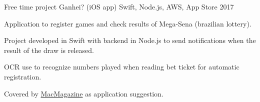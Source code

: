 \begin{cventries}
  \cventry
    {Free time project} %
    {Ganhei? (iOS app)} %
    {Swift, Node.js, AWS, App Store} %
    {2017} %
    {
      \begin{cvitems} %
        \item {Application to register games and check results of Mega-Sena (brazilian lottery).}
        \item {Project developed in Swift with backend in Node.js to send notifications when the result of the draw is released.}
        \item {OCR use to recognize numbers played when reading bet ticket for automatic registration.}
        \item {Covered by \href{https://macmagazine.com.br/post/2017/06/14/com-o-app-ganhei-voce-cadastra-seus-jogos-da-mega-sena-com-uma-foto-e-sabe-se-ficou-milionario-em-primeira-mao/}{MacMagazine} as application suggestion.}
      \end{cvitems}
    }


\end{cventries}
